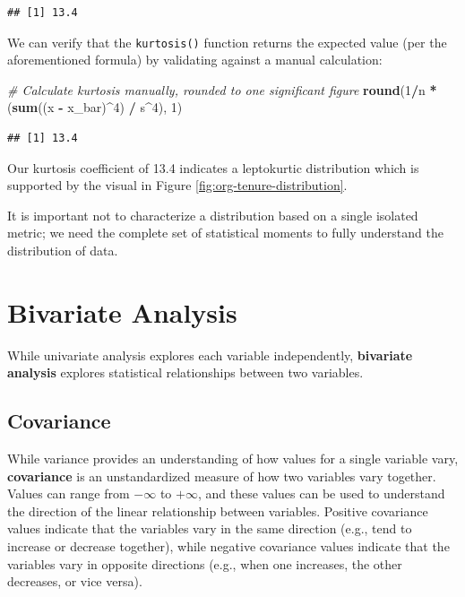 \documentclass[]{book}
\newenvironment{Shaded}{\begin{snugshade}}{\end{snugshade}}
\newcommand{\CommentTok}[1]{\textcolor[rgb]{0.56,0.35,0.01}{\textit{#1}}}
\newcommand{\DecValTok}[1]{\textcolor[rgb]{0.00,0.00,0.81}{#1}}
\newcommand{\KeywordTok}[1]{\textcolor[rgb]{0.13,0.29,0.53}{\textbf{#1}}}
\newcommand{\NormalTok}[1]{#1}
\newcommand{\OperatorTok}[1]{\textcolor[rgb]{0.81,0.36,0.00}{\textbf{#1}}}
\newcommand{\StringTok}[1]{\textcolor[rgb]{0.31,0.60,0.02}{#1}}
\begin{document}
\begin{verbatim}
## [1] 13.4
\end{verbatim}

We can verify that the \texttt{kurtosis()} function returns the expected value (per the aforementioned formula) by validating against a manual calculation:

\begin{Shaded}
\begin{Highlighting}[]
\CommentTok{# Calculate kurtosis manually, rounded to one significant figure}
\KeywordTok{round}\NormalTok{(}\DecValTok{1}\OperatorTok{/}\NormalTok{n }\OperatorTok{*}\StringTok{ }\NormalTok{(}\KeywordTok{sum}\NormalTok{((x }\OperatorTok{-}\StringTok{ }\NormalTok{x_bar)}\OperatorTok{^}\DecValTok{4}\NormalTok{) }\OperatorTok{/}\StringTok{ }\NormalTok{s}\OperatorTok{^}\DecValTok{4}\NormalTok{), }\DecValTok{1}\NormalTok{)}
\end{Highlighting}
\end{Shaded}

\begin{verbatim}
## [1] 13.4
\end{verbatim}

Our kurtosis coefficient of 13.4 indicates a leptokurtic distribution which is supported by the visual in Figure \ref{fig:org-tenure-distribution}.

It is important not to characterize a distribution based on a single isolated metric; we need the complete set of statistical moments to fully understand the distribution of data.

\hypertarget{bivariate-analysis}{%
\section{Bivariate Analysis}\label{bivariate-analysis}}

While univariate analysis explores each variable independently, \textbf{bivariate analysis} explores statistical relationships between two variables.

\hypertarget{covariance}{%
\subsection{Covariance}\label{covariance}}

While variance provides an understanding of how values for a single variable vary, \textbf{covariance} is an unstandardized measure of how two variables vary together. Values can range from \(-\infty\) to \(+\infty\), and these values can be used to understand the direction of the linear relationship between variables. Positive covariance values indicate that the variables vary in the same direction (e.g., tend to increase or decrease together), while negative covariance values indicate that the variables vary in opposite directions (e.g., when one increases, the other decreases, or vice versa).
\end{document}
